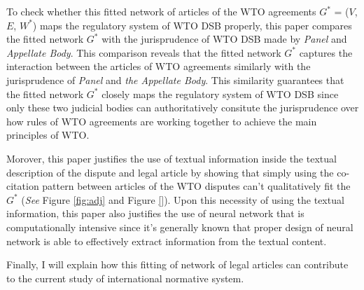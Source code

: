 To check whether this fitted network of articles of the WTO agreements $G^*$ = ($V$, $E$, $W^*$) maps the regulatory system of WTO DSB properly, this paper
compares the fitted network $G^*$ with the jurisprudence of WTO DSB made by \textit{Panel} and \textit{Appellate Body}. 
This comparison reveals that the fitted network $G^*$ captures the interaction between the articles of WTO agreements
similarly with the jurisprudence of \textit{Panel} and \textit{the Appellate Body}. This similarity guarantees that the fitted network $G^*$ closely maps the regulatory system of WTO DSB since only these two judicial bodies 
can authoritatively consitute the jurisprudence over how rules of WTO agreements are working together 
to achieve the main principles of WTO.

Morover, this paper justifies the use of textual information inside the textual description of the dispute and legal article by showing that simply using the co-citation pattern between articles of the WTO disputes can't qualitatively fit the $G^*$ (\textit{See} Figure \ref{fig:adj} and Figure \ref{}). 
Upon this necessity of using the textual information, this paper also justifies the use of neural network that is computationally intensive since it's generally known that proper design of neural network is able to effectively extract information from the textual content.

Finally, I will explain how this fitting of network of legal articles can contribute to the current study of international normative system.
